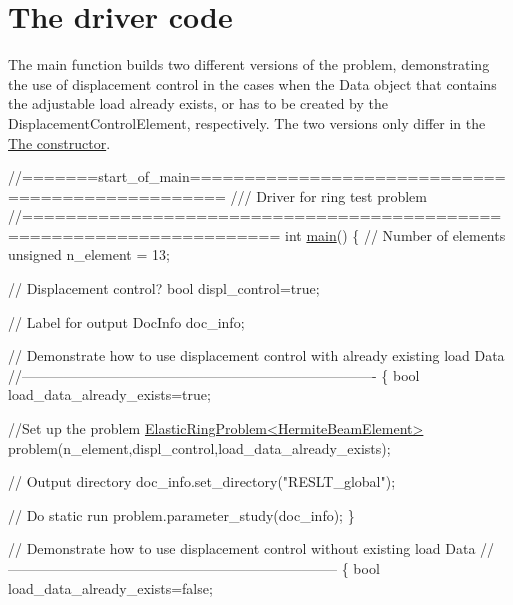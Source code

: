 \hypertarget{index_main}{}\section{The driver code}\label{index_main}
The main function builds two different versions of the problem, demonstrating the use of displacement control in the cases when the {\ttfamily Data} object that contains the adjustable load already exists, or has to be created by the {\ttfamily Displacement\+Control\+Element}, respectively. The two versions only differ in the \hyperlink{index_constructor}{The constructor}.

 
\begin{DoxyCodeInclude}
\textcolor{comment}{//=======start\_of\_main=================================================}
\textcolor{comment}{/// Driver for ring test problem }
\textcolor{comment}{}\textcolor{comment}{//=====================================================================}
\textcolor{keywordtype}{int} \hyperlink{steady__ring_8cc_ae66f6b31b5ad750f1fe042a706a4e3d4}{main}()
\{
 \textcolor{comment}{// Number of elements}
 \textcolor{keywordtype}{unsigned} n\_element = 13;

 \textcolor{comment}{// Displacement control?}
 \textcolor{keywordtype}{bool} displ\_control=\textcolor{keyword}{true};
 
 \textcolor{comment}{// Label for output}
 DocInfo doc\_info;
  
 \textcolor{comment}{// Demonstrate how to use displacement control with already existing load Data}
 \textcolor{comment}{//----------------------------------------------------------------------------}
 \{
  \textcolor{keywordtype}{bool} load\_data\_already\_exists=\textcolor{keyword}{true};

  \textcolor{comment}{//Set up the problem}
  \hyperlink{classElasticRingProblem}{ElasticRingProblem<HermiteBeamElement>} 
   problem(n\_element,displ\_control,load\_data\_already\_exists);
  
  \textcolor{comment}{// Output directory}
  doc\_info.set\_directory(\textcolor{stringliteral}{"RESLT\_global"});
  
  \textcolor{comment}{// Do static run}
  problem.parameter\_study(doc\_info);
 \}

 \textcolor{comment}{// Demonstrate how to use displacement control without existing load Data}
 \textcolor{comment}{//-----------------------------------------------------------------------}
 \{
  \textcolor{keywordtype}{bool} load\_data\_already\_exists=\textcolor{keyword}{false};


\end{DoxyCodeInclude}
